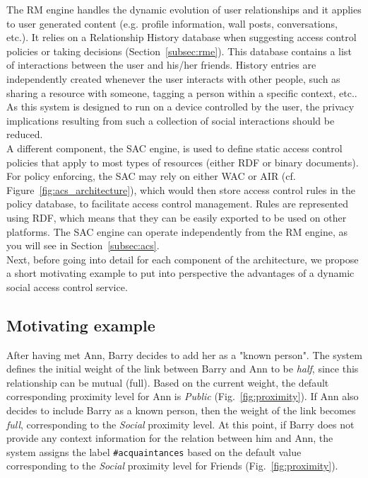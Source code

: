 The RM engine handles the dynamic evolution of user relationships and it applies to user generated content (e.g. profile information, wall posts, conversations, etc.). It relies on a Relationship History database when suggesting access control policies or taking decisions (Section~\ref{subsec:rme}). This database contains a list of interactions between the user and his/her friends. History entries are independently created whenever the user interacts with other people, such as sharing a resource with someone, tagging a person within a specific context, etc.. As this system is designed to run on a device controlled by the user, the privacy implications resulting from such a collection of social interactions should be reduced.\\

A different component, the SAC engine, is used to define static access control policies that apply to most types of resources (either RDF or binary documents). For policy enforcing, the SAC may rely on either WAC or AIR (cf. Figure~\ref{fig:acs_architecture}), which would then store access control rules in the policy database, to facilitate access control management. Rules are represented using RDF, which means that they can be easily exported to be used on other platforms. The SAC engine can operate independently from the RM engine, as you will see in Section~\ref{subsec:acs}.\\

Next, before going into detail for each component of the architecture, we propose a short motivating example to put into perspective the advantages of a dynamic social access control service.

\subsection{Motivating example} 
\label{subsec:example}
After having met Ann, Barry decides to add her as a "known person". The system defines the initial weight of the link between Barry and Ann to be \textit{half}, since this relationship can be mutual (full). Based on the current weight, the default corresponding proximity level for Ann is \textit{Public} (Fig.~\ref{fig:proximity}). If Ann also decides to include Barry as a known person, then the weight of the link becomes \textit{full}, corresponding to the \textit{Social} proximity level. At this point, if Barry does not provide any context information for the relation between him and Ann, the system assigns the label \verb+#acquaintances+ based on the default value corresponding to the \textit{Social} proximity level for Friends (Fig.~\ref{fig:proximity}).\\

